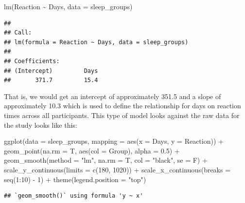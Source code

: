 \documentclass[
]{book}
\newenvironment{Shaded}{\begin{snugshade}}{\end{snugshade}}
\newcommand{\AttributeTok}[1]{\textcolor[rgb]{0.77,0.63,0.00}{#1}}
\newcommand{\DecValTok}[1]{\textcolor[rgb]{0.00,0.00,0.81}{#1}}
\newcommand{\FloatTok}[1]{\textcolor[rgb]{0.00,0.00,0.81}{#1}}
\newcommand{\FunctionTok}[1]{\textcolor[rgb]{0.00,0.00,0.00}{#1}}
\newcommand{\NormalTok}[1]{#1}
\newcommand{\SpecialCharTok}[1]{\textcolor[rgb]{0.00,0.00,0.00}{#1}}
\newcommand{\StringTok}[1]{\textcolor[rgb]{0.31,0.60,0.02}{#1}}
\begin{document}
\begin{Shaded}
\begin{Highlighting}[]
\FunctionTok{lm}\NormalTok{(Reaction }\SpecialCharTok{\textasciitilde{}}\NormalTok{ Days, }\AttributeTok{data =}\NormalTok{ sleep\_groups)}
\end{Highlighting}
\end{Shaded}

\begin{verbatim}
## 
## Call:
## lm(formula = Reaction ~ Days, data = sleep_groups)
## 
## Coefficients:
## (Intercept)         Days  
##       371.7         15.4
\end{verbatim}

That is, we would get an intercept of approximately 351.5 and a slope of approximately 10.3 which is used to define the relationship for days on reaction times across all participants. This type of model looks against the raw data for the study looks like this:

\begin{Shaded}
\begin{Highlighting}[]
\FunctionTok{ggplot}\NormalTok{(}\AttributeTok{data =}\NormalTok{ sleep\_groups, }\AttributeTok{mapping =} \FunctionTok{aes}\NormalTok{(}\AttributeTok{x =}\NormalTok{ Days, }\AttributeTok{y =}\NormalTok{ Reaction)) }\SpecialCharTok{+}
  \FunctionTok{geom\_point}\NormalTok{(}\AttributeTok{na.rm =}\NormalTok{ T, }\FunctionTok{aes}\NormalTok{(}\AttributeTok{col =}\NormalTok{ Group), }\AttributeTok{alpha =} \FloatTok{0.5}\NormalTok{) }\SpecialCharTok{+}
  \FunctionTok{geom\_smooth}\NormalTok{(}\AttributeTok{method =} \StringTok{"lm"}\NormalTok{, }\AttributeTok{na.rm =}\NormalTok{ T, }\AttributeTok{col =} \StringTok{"black"}\NormalTok{, }\AttributeTok{se =}\NormalTok{ F) }\SpecialCharTok{+}
  \FunctionTok{scale\_y\_continuous}\NormalTok{(}\AttributeTok{limits =} \FunctionTok{c}\NormalTok{(}\DecValTok{180}\NormalTok{, }\DecValTok{1020}\NormalTok{)) }\SpecialCharTok{+}
  \FunctionTok{scale\_x\_continuous}\NormalTok{(}\AttributeTok{breaks =} \FunctionTok{seq}\NormalTok{(}\DecValTok{1}\SpecialCharTok{:}\DecValTok{10}\NormalTok{) }\SpecialCharTok{{-}} \DecValTok{1}\NormalTok{) }\SpecialCharTok{+}
  \FunctionTok{theme}\NormalTok{(}\AttributeTok{legend.position =} \StringTok{"top"}\NormalTok{)}
\end{Highlighting}
\end{Shaded}

\begin{verbatim}
## `geom_smooth()` using formula 'y ~ x'
\end{verbatim}
\end{document}
